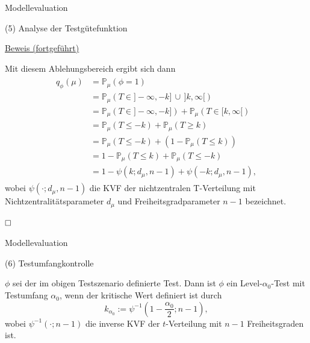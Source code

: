 \documentclass[
  8pt,
  ignorenonframetext,
]{beamer}
\begin{document}
\begin{frame}{Modellevaluation}
\protect\hypertarget{modellevaluation-10}{}

\noindent (5) Analyse der Testgütefunktion

\footnotesize

\underline{Beweis (fortgeführt)}

Mit diesem Ablehungsbereich ergibt sich dann \begin{align}
\begin{split}
q_\phi(\mu)
& = \mathbb{P}_{\mu}(\phi = 1)                                                   \\
& = \mathbb{P}_{\mu}\left(T \in ]-\infty, -k]\,
                         \cup \,]k,\infty[ \right)                               \\
& = \mathbb{P}_{\mu}\left(T \in ]-\infty, -k]\right)
  + \mathbb{P}_{\mu}\left(T \in [k,\infty[ \right)                               \\
& = \mathbb{P}_{\mu}(T \le -k)  + \mathbb{P}_{\mu}(T \ge k)                      \\
& = \mathbb{P}_{\mu}(T \le -k)  + (1-\mathbb{P}_{\mu}(T \le k))                  \\
& = 1 - \mathbb{P}_{\mu}(T \le k)  + \mathbb{P}_{\mu}(T \le - k)                 \\
& = 1 - \psi(k; d_\mu, n-1)  + \psi(-k;d_\mu,n-1),
\end{split}
\end{align} wobei \(\psi(\cdot; d_\mu,n-1)\) die KVF der nichtzentralen
T-Verteilung mit Nichtzentralitätsparameter \(d_\mu\) und
Freiheitsgradparameter \(n-1\) bezeichnet.

\(\hfill\Box\) \vfill
\end{frame}

\begin{frame}{Modellevaluation}
\protect\hypertarget{modellevaluation-11}{}

\noindent (6) Testumfangkontrolle \vfill \small

\begin{theorem}[Testumfangkontrolle]
\justifying
\normalfont
$\phi$ sei der im obigen Testszenario definierte Test. Dann ist $\phi$ ein
Level-$\alpha_0$-Test mit Testumfang $\alpha_0$, wenn der kritische Wert
definiert ist durch
\begin{equation}
k_{\alpha_0} := \psi^{-1}\left(1 - \frac{\alpha_0}{2}; n-1 \right),
\end{equation}
wobei $\psi^{-1}(\cdot; n-1)$ die inverse KVF der $t$-Verteilung mit $n-1$
Freiheitsgraden ist.
\end{theorem}
\vfill
\end{frame}
\end{document}
